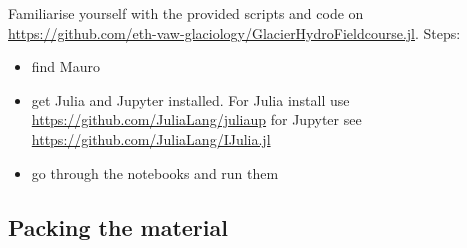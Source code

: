 \documentclass[DIV=15,halfparskip,11pt,headinclude]{scrartcl}
\begin{document}
Familiarise yourself with the provided scripts and code on\\
\url{https://github.com/eth-vaw-glaciology/GlacierHydroFieldcourse.jl}.
Steps:
\begin{itemize}
\item find Mauro
\item get Julia and Jupyter installed. For Julia install use \url{https://github.com/JuliaLang/juliaup} for Jupyter see \url{https://github.com/JuliaLang/IJulia.jl}
\item go through the notebooks and run them
\end{itemize}


\subsection{Packing the material}
\end{document}
